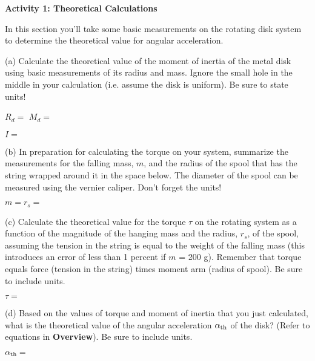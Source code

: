 \medskip
\textbf{Activity 1: Theoretical Calculations }

In this section you'll take some basic measurements on the rotating disk system
to determine the theoretical value for angular acceleration.  

(a) Calculate the theoretical value of the moment of inertia of the metal disk
using basic measurements of its radius and mass. Ignore the small hole in the
middle in your calculation (i.e. assume the disk is uniform). Be sure to state 
units!
\vspace{5mm}

\hspace{0.5in}\( R_{d} =\) \hfill{}\( M_{d}= \) \hfill{}
\vspace{5mm}

\hspace{0.5in}\( I = \) 
\answerspace{5mm}

\pagebreak
(b) In preparation for calculating the torque on your system, summarize the
measurements for the falling mass, $m$, and the radius of the spool that has the string wrapped around it in the space below. The diameter of the spool can be measured using the vernier caliper. Don't forget the units!
\vspace{5mm}

\hspace{0.5in}$m = $\hfill{}\(r_{s}= \)\hfill{} 
\answerspace{5mm}

(c) Calculate the theoretical value for the torque $\tau$ on the rotating system as
a function of the magnitude of the hanging mass and the radius, \( r_{s} \),
of the spool, assuming the tension in the string is equal to the weight of the 
falling mass (this introduces an error of less than 1 percent if $m$ = 200 g). 
Remember that torque equals force (tension in the string) times 
moment arm (radius of spool). Be sure to include units.
\vspace{5mm}

\hspace{0.5in}\( \tau= \)
\answerspace{5mm}

(d) Based on the values of torque and moment of inertia that you just 
calculated, what is the theoretical value of the angular acceleration $\alpha _{\rm th}$ of the 
disk? (Refer to equations in \textbf{Overview}). Be sure to include units.
\vspace{5mm}

\hspace{0.5in}\( \alpha _{\rm th}= \)
\answerspace{5mm}

